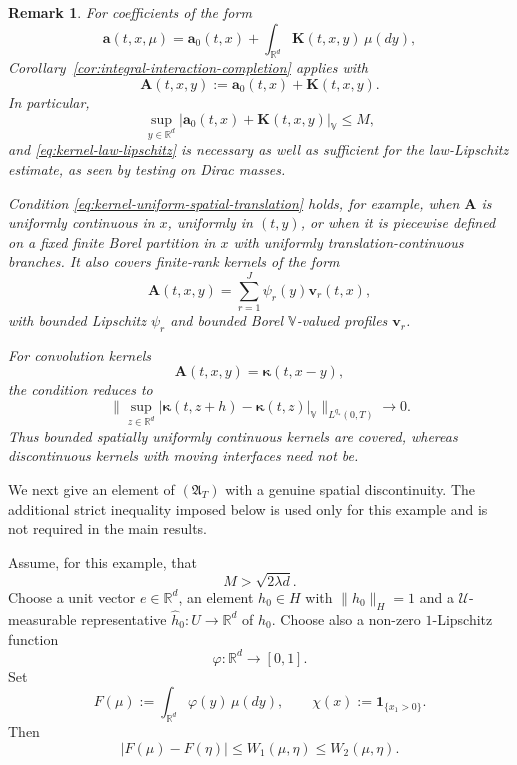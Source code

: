\documentclass[12pt,oneside, reqno]{amsart}
\newtheorem{remark}[theorem]{Remark}
\numberwithin{equation}{section}
\begin{document}
\begin{remark}
	\label{rem:interaction-kernel-examples}
	For coefficients of the form
	\[
	\mathbf a(t,x,\mu)
	=
	\mathbf a_0(t,x)
	+
	\int_{\mathbb R^d}
	\mathbf K(t,x,y)\,\mu(dy),
	\]
	Corollary~\ref{cor:integral-interaction-completion} applies with
	\[
	\mathbf A(t,x,y)
	:=
	\mathbf a_0(t,x)+\mathbf K(t,x,y).
	\]
	In particular,
	\[
	\sup_{y\in\mathbb R^d}
	|\mathbf a_0(t,x)+\mathbf K(t,x,y)|_{\mathbb V}
	\leq M,
	\]
	and \eqref{eq:kernel-law-lipschitz} is necessary as well as sufficient
	for the law-Lipschitz estimate, as seen by testing on Dirac masses.
	
	Condition \eqref{eq:kernel-uniform-spatial-translation} holds, for example,
	when \(\mathbf A\) is uniformly continuous in \(x\), uniformly in
	\((t,y)\), or when it is piecewise defined on a fixed finite Borel
	partition in \(x\) with uniformly translation-continuous branches. It
	also covers finite-rank kernels of the form
	\[
	\mathbf A(t,x,y)
	=
	\sum_{r=1}^J
	\psi_r(y)\mathbf v_r(t,x),
	\]
	with bounded Lipschitz \(\psi_r\) and bounded Borel
	\(\mathbb V\)-valued profiles \(\mathbf v_r\).
	
	For convolution kernels
	\[
	\mathbf A(t,x,y)
	=
	\boldsymbol\kappa(t,x-y),
	\]
	the condition reduces to
	\[
	\big\|
	\sup_{z\in\mathbb R^d}
	|\boldsymbol\kappa(t,z+h)-\boldsymbol\kappa(t,z)|_{\mathbb V}
	\big\|_{L^{q_\ast}(0,T)}
	\longrightarrow0.
	\]
	Thus bounded spatially uniformly continuous kernels are covered, whereas
	discontinuous kernels with moving interfaces need not be.
\end{remark}
	
	We next give an element of $(\mathfrak A_T)$ with a genuine spatial
	discontinuity. The additional strict inequality imposed below is used
	only for this example and is not required in the main results.
	
	Assume, for this example, that
	\begin{equation}
		\label{eq:strict-bound-margin-example}
		M>\sqrt{2\lambda d}.
	\end{equation}
	Choose a unit vector $e\in\mathbb R^d$, an element $h_0\in H$ with	\(\|h_0\|_H=1\)
	and a $\mathcal U$-measurable representative
	\(\widehat h_0:U\longrightarrow\mathbb R^d\)
	of $h_0$. Choose also a non-zero $1$-Lipschitz function
	\[
	\varphi:\mathbb R^d\longrightarrow[0,1].
	\]
	Set
	\[
	F(\mu)
	:=
	\int_{\mathbb R^d}\varphi(y)\,\mu(dy),
	\qquad
	\chi(x)
	:=
	\mathbf{1}_{\{x_1>0\}}.
	\]
	Then
	\begin{equation}
		\label{eq:F-Wasserstein-Lipschitz}
		|F(\mu)-F(\eta)|
		\leq
		W_1(\mu,\eta)
		\leq
		W_2(\mu,\eta).
	\end{equation}
	
\end{document}
